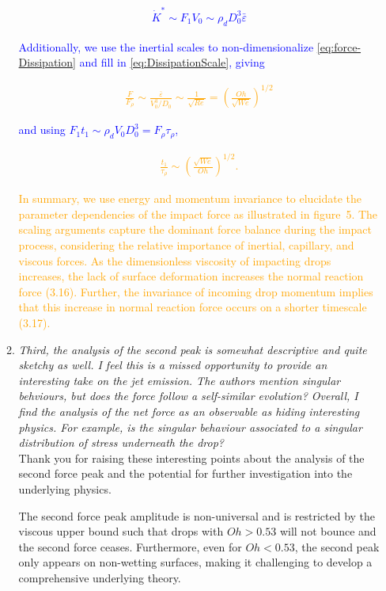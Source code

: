 \documentclass[]{article}
\newcommand*\blue{\textcolor{blue}}
\newcommand{\VS}[1]{{\textcolor{orange}{#1}}}
\begin{document}
\begin{enumerate}
\begin{enumerate}
		\blue{\begin{align}\label{eq:force-Dissipation}
				\dot{K}^* \sim F_1V_0 \sim \rho_dD_0^3\bar{\varepsilon}
		\end{align}}
		
		\noindent \blue{Additionally, we use the inertial scales to non-dimensionalize  \eqref{eq:force-Dissipation} and fill in \eqref{eq:DissipationScale}, giving}
		
		\VS{\begin{align}
				\frac{F}{F_\rho} \sim \frac{\bar{\varepsilon}}{V_0^3/D_0} \sim \frac{1}{\sqrt{Re}} = \left(\frac{Oh}{\sqrt{We}}\right)^{1/2}
		\end{align}}
		
		\noindent \blue{and using $F_1t_1 \sim \rho_dV_0D_0^3 = F_\rho\tau_\rho$,}
		
		\VS{\begin{align}
				\frac{t_1}{\tau_\rho} \sim \left(\frac{\sqrt{We}}{Oh}\right)^{1/2}.
		\end{align}}
		
		\VS{In summary, we use energy and momentum invariance to elucidate the parameter dependencies of the impact force as illustrated in figure~5. The scaling arguments capture the dominant force balance during the impact process, considering the relative importance of inertial, capillary, and viscous forces. As the dimensionless viscosity of impacting drops increases, the lack of surface deformation increases the normal reaction force (3.16). Further, the invariance of incoming drop momentum implies that this increase in normal reaction force occurs on a shorter timescale (3.17).}
		
		\item \textit{Third, the analysis of the second peak is somewhat descriptive and quite sketchy as well. I feel this is a missed opportunity to provide an interesting take on the jet emission. The authors mention singular behviours, but does the force follow a self-similar evolution? Overall, I find the analysis of the net force as an observable as hiding interesting physics. For example, is the singular behaviour associated to a singular distribution of stress underneath the drop?}\\[0.5mm]
		
		Thank you for raising these interesting points about the analysis of the second force peak and the potential for further investigation into the underlying physics. 
		
		The second force peak amplitude is non-universal and is restricted by the viscous upper bound such that drops with $Oh > 0.53$ will not bounce and the second force ceases. Furthermore, even for $Oh < 0.53$, the second peak only appears on non-wetting surfaces, making it challenging to develop a comprehensive underlying theory. 
		

\end{enumerate}
\end{enumerate}
\end{document}
